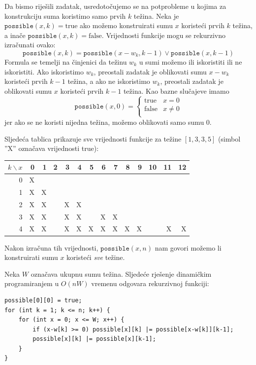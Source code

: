 Da bismo riješili zadatak, usredotočujemo se na potprobleme
u kojima za konstrukciju suma koristimo samo prvih $k$
težina.
Neka je $\texttt{possible}(x,k)=\textrm{true}$ ako
možemo konstruirati sumu $x$
koristeći prvih $k$ težina,
a inače $\texttt{possible}(x,k)=\textrm{false}$.
Vrijednosti funkcije mogu se rekurzivno
izračunati ovako:
\[ \texttt{possible}(x,k) = \texttt{possible}(x-w_k,k-1) \lor \texttt{possible}(x,k-1) \]
Formula se temelji na činjenici da težinu $w_k$
u sumi možemo ili iskoristiti ili ne iskoristiti.
Ako iskoristimo $w_k$, preostali zadatak je
oblikovati sumu $x-w_k$ koristeći prvih $k-1$ težina,
a ako ne iskoristimo $w_k$,
preostali zadatak je oblikovati sumu $x$
koristeći prvih $k-1$ težina.
Kao bazne slučajeve imamo
\begin{equation*}
    \texttt{possible}(x,0) = \begin{cases}
               \textrm{true}    & x = 0\\
               \textrm{false}   & x \neq 0 \\
           \end{cases}
\end{equation*}
jer ako se ne koristi nijedna težina,
možemo oblikovati samo sumu 0.

Sljedeća tablica prikazuje sve vrijednosti funkcije
za težine $[1,3,3,5]$ (simbol ''X''
označava vrijednosti true):

\begin{center}
\begin{tabular}{r|rrrrrrrrrrrrr}
$k \backslash x$ & 0 & 1 & 2 & 3 & 4 & 5 & 6 & 7 & 8 & 9 & 10 & 11 & 12 \\
\hline
 0 & X & \\
 1 & X & X \\
 2 & X & X & & X & X \\
 3 & X & X & & X & X & & X & X \\
 4 & X & X & & X & X & X & X & X & X & X & & X & X \\
\end{tabular}
\end{center}

Nakon izračuna tih vrijednosti, $\texttt{possible}(x,n)$
nam govori možemo li konstruirati
sumu $x$ koristeći \emph{sve} težine.

Neka $W$ označava ukupnu sumu težina.
Sljedeće rješenje dinamičkim programiranjem
u $O(nW)$ vremenu
odgovara rekurzivnoj funkciji:
\begin{lstlisting}
possible[0][0] = true;
for (int k = 1; k <= n; k++) {
    for (int x = 0; x <= W; x++) {
        if (x-w[k] >= 0) possible[x][k] |= possible[x-w[k]][k-1];
        possible[x][k] |= possible[x][k-1];
    }
}
\end{lstlisting}

